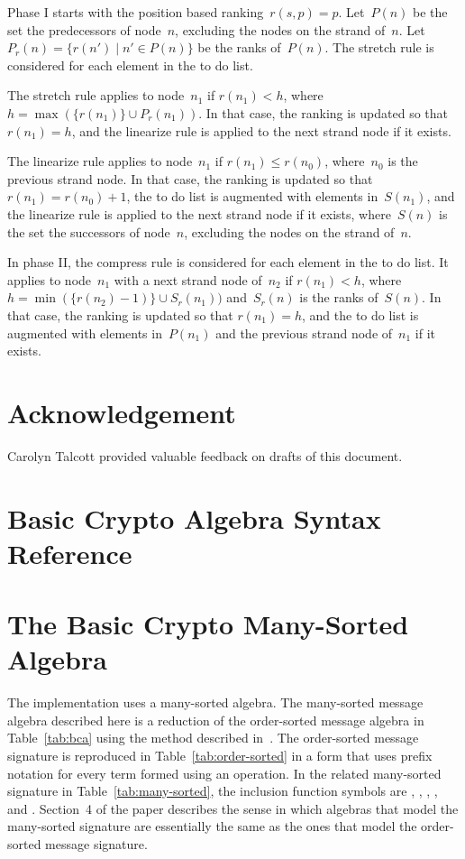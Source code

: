 \documentclass[12pt]{report}
\theoremstyle{definition}
\begin{document}
Phase I starts with the position based ranking~$r(s,p)=p$.  Let~$P(n)$
be the set the predecessors of node~$n$, excluding the nodes on the
strand of~$n$.  Let~$P_r(n)=\{r(n')\mid n'\in P(n)\}$ be the ranks
of~$P(n)$.  The stretch rule is considered for each element in the
to do list.

The stretch rule applies to node~$n_1$ if $r(n_1)<h$, where
$h=\max(\{r(n_1)\}\cup P_r(n_1))$.  In that case, the ranking is updated
so that $r(n_1)=h$, and the linearize rule is applied to the next strand
node if it exists.

The linearize rule applies to node~$n_1$ if $r(n_1)\leq r(n_0)$,
where~$n_0$ is the previous strand node.  In that case, the ranking is
updated so that $r(n_1)=r(n_0)+1$, the to do list is augmented with
elements in~$S(n_1)$, and the linearize rule is applied to the next
strand node if it exists, where~$S(n)$ is the set the successors of
node~$n$, excluding the nodes on the strand of~$n$.

In phase II, the compress rule is considered for each element in the
to do list.  It applies to node~$n_1$ with a next strand node of~$n_2$
if $r(n_1)<h$, where $h=\min(\{r(n_2)-1)\}\cup S_r(n_1))$ and~$S_r(n)$
is the ranks of~$S(n)$.  In that case, the ranking is updated so that
$r(n_1)=h$, and the to do list is augmented with elements in~$P(n_1)$
and the previous strand node of~$n_1$ if it exists.

\chapter*{Acknowledgement}

Carolyn Talcott provided valuable feedback on drafts of this document.

\appendix

\chapter{Basic Crypto Algebra Syntax Reference}\label{cha:bca syntax reference}



\chapter{The Basic Crypto Many-Sorted Algebra}\label{cha:bca}

The implementation uses a many-sorted algebra.  The many-sorted
message algebra described here is a reduction of the order-sorted
message algebra in Table~\ref{tab:bca} using the method described
in~\cite[Section~4]{GoguenMeseguer92}.  The order-sorted message
signature is reproduced in Table~\ref{tab:order-sorted} in a form that
uses prefix notation for every term formed using an operation.  In the
related many-sorted signature in Table~\ref{tab:many-sorted}, the
inclusion function symbols are ,
, , , and .  Section~4 of the
paper describes the sense in which algebras that model the many-sorted
signature are essentially the same as the ones that model the
order-sorted message signature.
\end{document}

